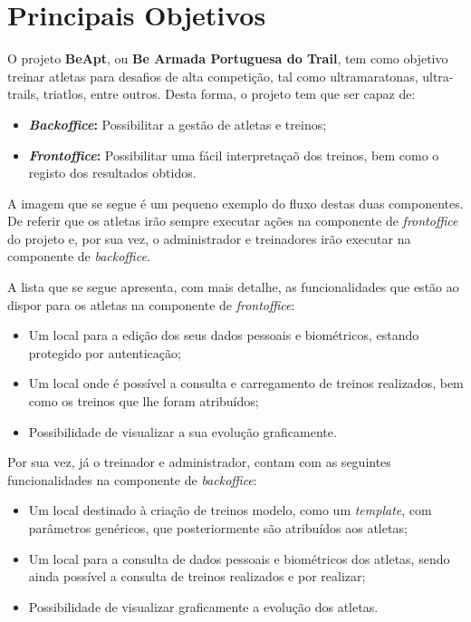 \section{Principais Objetivos}

O projeto \textbf{BeApt}, ou \textbf{Be Armada Portuguesa do Trail}, tem como objetivo treinar atletas para desafios de alta competição, tal como ultramaratonas, ultra-trails, triatlos, entre outros. Desta forma, o projeto tem que ser capaz de:

\begin{itemize}
	\item \textbf{\textit{Backoffice}:} Possibilitar a gestão de atletas e treinos;
	\item \textbf{\textit{Frontoffice}:} Possibilitar uma fácil interpretaçaõ dos treinos, bem como o registo dos resultados obtidos.
\end{itemize}

A imagem que se segue é um pequeno exemplo do fluxo destas duas componentes. De referir que os atletas irão sempre executar ações na componente de \textit{frontoffice} do projeto e, por sua vez, o administrador e treinadores irão executar na componente de \textit{backoffice}.


A lista que se segue apresenta, com mais detalhe, as funcionalidades que estão ao dispor para os atletas na componente de \textit{frontoffice}:

\begin{itemize}
	\item Um local para a edição dos seus dados pessoais e biométricos, estando protegido por autenticação;
	\item Um local onde é possível a consulta e carregamento de treinos realizados, bem como os treinos que lhe foram atribuídos;
	\item Possibilidade de visualizar a sua evolução graficamente.
\end{itemize}

Por sua vez, já o treinador e administrador, contam com as seguintes funcionalidades na componente de \textit{backoffice}:

\begin{itemize}
	\item Um local destinado à criação de treinos modelo, como um \textit{template}, com parâmetros genéricos, que posteriormente são atribuídos aos atletas;
	\item Um local para a consulta de dados pessoais e biométricos dos atletas, sendo ainda possível a consulta de treinos realizados e por realizar;
	\item Possibilidade de visualizar graficamente a evolução dos atletas.
\end{itemize}